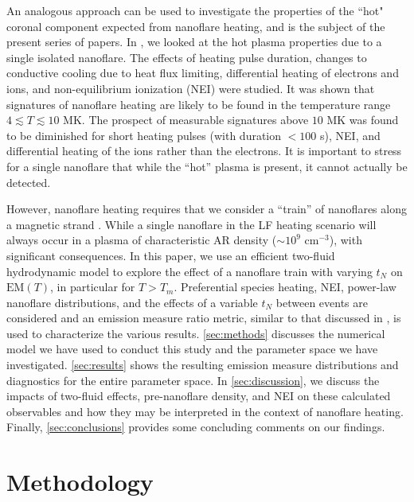 \documentclass[preprint,linenumbers]{aastex}
\begin{document}
	\par An analogous approach can be used to investigate the properties of the ``hot" coronal component expected from nanoflare heating, and is the subject of the present series of papers. In \citet{barnes_inference_2016} , we looked at the hot plasma properties due to a single isolated nanoflare. The effects of heating pulse duration, changes to conductive cooling due to heat flux limiting, differential heating of electrons and ions, and non-equilibrium ionization (NEI) were studied. It was shown that signatures of nanoflare heating are likely to be found in the temperature range $4\lesssim T\lesssim 10$ MK. The prospect of measurable signatures above $10$ MK was found to be diminished for short heating pulses (with duration $<100$ s), NEI, and differential heating of the ions rather than the electrons. It is important to stress for a single nanoflare that while the ``hot'' plasma is present, it cannot actually be detected.
	\par However, nanoflare heating requires that we consider a ``train'' of nanoflares along a magnetic strand \citep{viall_patterns_2011,warren_constraints_2011,reep_diagnosing_2013,cargill_modelling_2015}. While a single nanoflare in the LF heating scenario will always occur in a plasma of characteristic AR density ($\sim10^9$ cm$^{-3}$), with significant consequences. In this paper, we use an efficient two-fluid hydrodynamic model to explore the effect of a nanoflare train with varying $t_N$ on $\mathrm{EM}(T)$, in particular for $T>T_m$. Preferential species heating, NEI, power-law nanoflare distributions, and the effects of a variable $t_N$ between events are considered and an emission measure ratio metric, similar to that discussed in \citet{brosius_pervasive_2014}, is used to characterize the various results. \autoref{sec:methods} discusses the numerical model we have used to conduct this study and the parameter space we have investigated. \autoref{sec:results} shows the resulting emission measure distributions and diagnostics for the entire parameter space. In \autoref{sec:discussion}, we discuss the impacts of two-fluid effects, pre-nanoflare density, and NEI on these calculated observables and how they may be interpreted in the context of nanoflare heating. Finally, \autoref{sec:conclusions} provides some concluding comments on our findings.
	\section{Methodology}
	\label{sec:methods}
\end{document}
